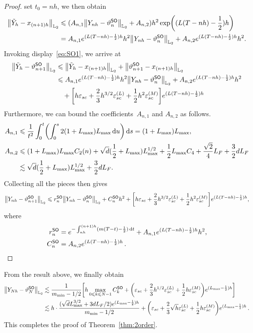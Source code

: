 \begin{proof}
set $t_0=nh$, we then obtain
\begin{align*}
    \l|\tilde{Y}_h-x_{(n+1)h}\r|_{\Ltwo}&\leqslant (A_{n,1}\l|Y_{nh}-\vartheta_n^{\sf SO}\r|_{\Ltwo}+A_{n,2})h^2\exp\left((L(T-nh)-\dfrac{1}{2})h\right)\\
    &=A_{n,1}e^{(L(T-nh)-\frac{1}{2})h}h^2\l|Y_{nh}-\vartheta_n^{\sf SO}\r|_{\Ltwo}+A_{n,2}e^{(L(T-nh)-\frac{1}{2})h}h^2.
\end{align*}
Invoking display~\eqref{eq:SO1}, we  arrive at
\begin{align*}
    \l|\tilde{Y}_h-\vartheta_{n+1}^{\sf SO}\r|_{\Ltwo}&\leqslant\l|\tilde{Y}_h-x_{(n+1)h}\r|_{\Ltwo}+\l|\vartheta_{n+1}^{\sf SO}-x_{(n+1)h}\r|_{\Ltwo}\\
    &\leqslant A_{n,1}e^{(L(T-nh)-\frac{1}{2})h}h^2\l|Y_{nh}-\vartheta_n^{\sf SO}\r|_{\Ltwo}+A_{n,2}e^{(L(T-nh)-\frac{1}{2})h}h^2\\
    &\quad +\left[h\varepsilon_{sc}+\dfrac{2}{3}h^{3/2}\varepsilon_{sc}^{(L)}+\dfrac{1}{2}h^2\varepsilon_{sc}^{(M)}\right]e^{(L(T-nh)-\frac{1}{2})h}
\end{align*}
Furthermore, we can bound the coefficients~$A_{n,1}$ and $A_{n,2}$ as follows.
\begin{align*}
    A_{n,1}&\leqslant\dfrac{1}{t^2}\int_0^t\left(\int_0^s2(1+L_{\max})L_{\max}\rmd u\right)\rmd s=(1+L_{\max})L_{\max},\\
    A_{n,2}&\leqslant(1+L_{\max})L_{\max}C_2(n)+\sqrt{d}(\dfrac{1}{2}+L_{\max})L_{\max}^{1/2}+\dfrac{1}{2}L_{\max}C_4+\dfrac{\sqrt{2}}{4}L_F+\dfrac{3}{2}dL_F\\
    &\lesssim\sqrt{d}(\dfrac{1}{2}+L_{\max})L_{\max}^{1/2}+\dfrac{3}{2}dL_F.
\end{align*}
Collecting all the pieces then gives
\begin{align*}
    \l|Y_{nh}-\vartheta_{n+1}^{\sf SO}\r|_{\Ltwo}\leqslant r_n^{\sf SO}\l|Y_{nh}-\vartheta_n^{\sf SO}\r|_{\Ltwo}+C_n^{\sf SO}h^2+\left[h\varepsilon_{sc}+\dfrac{2}{3}h^{3/2}\varepsilon_{sc}^{(L)}+\dfrac{1}{2}h^2\varepsilon_{sc}^{(M)}\right]e^{(L(T-nh)-\frac{1}{2})h},
\end{align*}
where
\begin{align*}
    r_n^{\sf SO}&=e^{-\int_{nh}^{(n+1)h}(m(T-t)-\frac{1}{2}){\,\rm d} t}+A_{n,1}e^{(L(T-nh)-\frac{1}{2})h}h^2,\\
    C_n^{\sf SO}&=A_{n,2}e^{(L(T-nh)-\frac{1}{2})h}\,.
\end{align*}

\end{proof}
From the result above, we finally obtain
\begin{align*}
    \l|Y_{Nh}-\vartheta_N^{\sf SO}\r|_{\Ltwo}&\lesssim \dfrac{1}{m_{\min}-1/2}\left[h\max_{0\leqslant k\leqslant N-1}C_k^{\sf SO}+\left(\varepsilon_{sc}+\dfrac{2}{3}h^{1/2}\varepsilon_{sc}^{(L)}+\dfrac{1}{2}h\varepsilon_{sc}^{(M)}\right)e^{(L_{\max}-\frac{1}{2})h}\right]\\
    &\lesssim h\cdot\dfrac{(\sqrt{d}L_{\max}^{3/2}+3dL_F/2)e^{(L_{\max}-\frac{1}{2})h}}{m_{\min}-1/2}+\left(\varepsilon_{sc}+\dfrac{2}{3}\sqrt{h}\varepsilon_{sc}^{(L)}+\dfrac{1}{2}h\varepsilon_{sc}^{(M)}\right)e^{(L_{\max}-\frac{1}{2})h}\,.
\end{align*}
This completes the proof of Theorem~\ref{thm:2order}.

